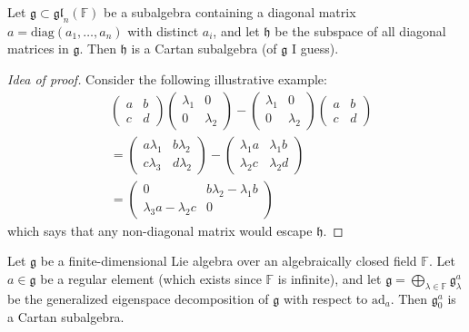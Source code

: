 \begin{proposition}
\label{proposition-diagonal-matrices-are-Cartan-subalgebra}
Let $\mathfrak{g}\subset \mathfrak{gl}_n(\mathbb{F})$ be a subalgebra
containing a diagonal matrix $a=\text{diag}(a_1,\ldots,a_n)$ 
with distinct $a_i$, and let $\mathfrak{h}$ be the subspace
of all diagonal matrices in $\mathfrak{g}$. Then $\mathfrak{h}$ 
is a Cartan subalgebra (of $\mathfrak{g}$ I guess).
\end{proposition}

\begin{proof}[Idea of proof]
Consider the following illustrative example:
\begin{align*}
&\begin{pmatrix}
a&b\\ 
c&d
\end{pmatrix}\begin{pmatrix}
\lambda_1&0\\ 
0&\lambda_2
\end{pmatrix}-\begin{pmatrix}
\lambda_1&0\\ 
0&\lambda_2
\end{pmatrix}\begin{pmatrix}
a&b\\ 
c&d
\end{pmatrix}\\
&=\begin{pmatrix}
a \lambda_1&b \lambda_2\\ 
c \lambda_3&d \lambda_2
\end{pmatrix}-
\begin{pmatrix}
\lambda_1a&\lambda_1b\\ 
\lambda_2c&\lambda_2d
\end{pmatrix}\\
&=\begin{pmatrix}
0&b\lambda_2-\lambda_1b\\ 
\lambda_3a-\lambda_2c&0
\end{pmatrix}\qquad 
\end{align*}
which says that any non-diagonal matrix would escape $\mathfrak{h}$.
\end{proof}

\begin{theorem}[Cartan]
\label{theorem-finite-dimensional-Lie-algebra-over-closed-field-has
-Cartan-subalgebra}
Let $\mathfrak{g}$ be a finite-dimensional Lie algebra over an 
algebraically closed field $\mathbb{F}$. Let $a \in \mathfrak{g}$ 
be a regular element (which exists since $\mathbb{F}$ is infinite),
and let $\mathfrak{g}=\bigoplus_{\lambda \in \mathbb{F}}\mathfrak{g}^a_\lambda$
be the generalized eigenspace decomposition of $\mathfrak{g}$ 
with respect to $\text{ad}_a$. Then $\mathfrak{g}_0^a$ 
is a Cartan subalgebra.
\end{theorem}

